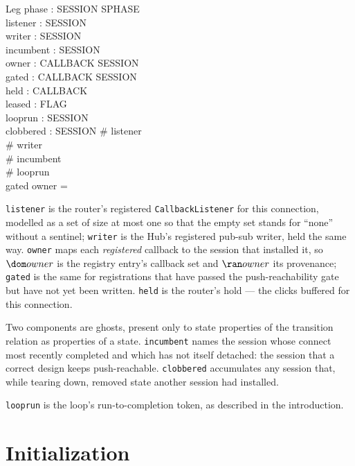 \documentclass[a4paper,10pt,fleqn]{article}
\begin{document}
\begin{schema}{Leg}
  phase : SESSION \fun SPHASE \\
  listener : \power SESSION \\
  writer : \power SESSION \\
  incumbent : \power SESSION \\
  owner : CALLBACK \pfun SESSION \\
  gated : CALLBACK \pfun SESSION \\
  held : \power CALLBACK \\
  leased : FLAG \\
  looprun : \power SESSION \\
  clobbered : \power SESSION
\where
  \# listener  \\
  \# writer  \\
  \# incumbent  \\
  \# looprun  \\
  \dom gated \cap \dom owner = \emptyset
\end{schema}

\texttt{listener} is the router's registered
\texttt{CallbackListener} for this connection, modelled as a set of size
at most one so that the empty set stands for ``none'' without a
sentinel; \texttt{writer} is the Hub's registered pub-sub writer, held
the same way.  \texttt{owner} maps each \emph{registered} callback to
the session that installed it, so $\dom owner$ is the registry
entry's callback set and $\ran owner$ its provenance;
\texttt{gated} is the same for registrations that have passed the
push-reachability gate but have not yet been written.  \texttt{held} is
the router's hold --- the clicks buffered for this connection.

Two components are ghosts, present only to state properties of the
transition relation as properties of a state.  \texttt{incumbent} names
the session whose connect most recently completed and which has not
itself detached: the session that a correct design keeps
push-reachable.  \texttt{clobbered} accumulates any session that, while
tearing down, removed state another session had installed.

\texttt{looprun} is the loop's run-to-completion token, as described in
the introduction.

\section{Initialization}
\end{document}
